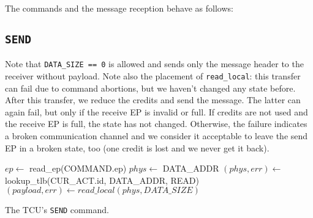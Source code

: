 \noindent The commands and the message reception behave as follows:

\subsection{\texttt{SEND}}

Note that \texttt{DATA\_SIZE == 0} is allowed and sends only the message header to the receiver
without payload. Note also the placement of \texttt{read\_local}: this transfer can fail due to
command abortions, but we haven't changed any state before. After this transfer, we reduce the
credits and send the message. The latter can again fail, but only if the receive EP is invalid or
full. If credits are not used and the receive EP is full, the state has not changed. Otherwise, the
failure indicates a broken communication channel and we consider it acceptable to leave the send EP
in a broken state, too (one credit is lost and we never get it back).

\begin{algorithm}
    $ep \gets$ read\_ep(COMMAND.ep)\;
    \extend{}
    \extend{}
    \BlankLine
    $phys \gets$ DATA\_ADDR\;
    $(phys, err) \gets$ lookup\_tlb(\colorbox{tilemux}{CUR\_ACT.id, }DATA\_ADDR, READ)\;
    \extend{}
    \BlankLine
    \BlankLine
    $(payload, err) \gets read\_local(phys, DATA\_SIZE)$\;
    \extend{}
    \BlankLine
    \caption{The TCU's \texttt{SEND} command.}
\end{algorithm}

